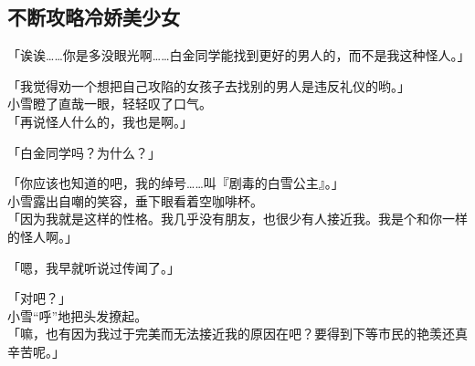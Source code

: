 \subsection{不断攻略冷娇美少女}

「诶诶……你是多没眼光啊……白金同学能找到更好的男人的，而不是我这种怪人。」

「我觉得劝一个想把自己攻陷的女孩子去找别的男人是违反礼仪的哟。」\\

小雪瞪了直哉一眼，轻轻叹了口气。\\

「再说怪人什么的，我也是啊。」

「白金同学吗？为什么？」

「你应该也知道的吧，我的绰号……叫『剧毒的白雪公主』。」\\

小雪露出自嘲的笑容，垂下眼看着空咖啡杯。\\

「因为我就是这样的性格。我几乎没有朋友，也很少有人接近我。我是个和你一样的怪人啊。」

「嗯，我早就听说过传闻了。」

「对吧？」\\

小雪“呼”地把头发撩起。\\

「嘛，也有因为我过于完美而无法接近我的原因在吧？要得到下等市民的艳羡还真辛苦呢。」

